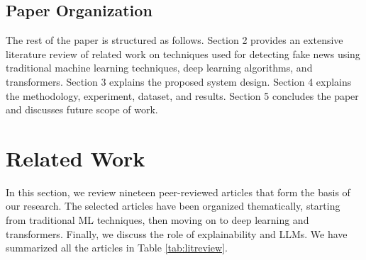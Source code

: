 \documentclass[runningheads]{llncs}
\begin{document}
\subsection{Paper Organization}
The rest of the paper is structured as follows. Section 2 provides an extensive literature review of related work on techniques used for detecting fake news using traditional machine learning techniques, deep learning algorithms, and transformers. Section 3 explains the proposed system design. Section 4 explains the methodology, experiment, dataset, and results. Section 5 concludes the paper and discusses future scope of work.

\section{Related Work}

In this section, we review nineteen peer-reviewed articles that form the basis of our research. The selected articles have been organized thematically, starting from traditional ML techniques, then moving on to deep learning and transformers. Finally, we discuss the role of explainability and LLMs. We have summarized all the articles in Table \ref{tab:litreview}.
\end{document}
